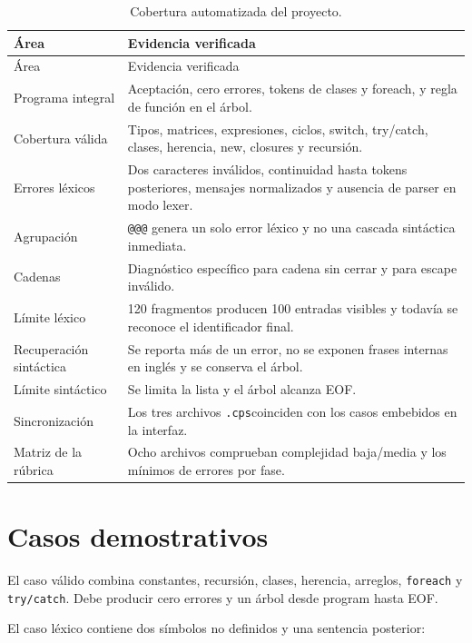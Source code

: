\documentclass[12pt,letterpaper,oneside]{report}
\renewcommand{\arraystretch}{1.2}
\newcommand{\archivo}[1]{\texttt{#1}}
\newcommand{\regla}[1]{\textsf{#1}}
\newcommand{\cps}{\texttt{.cps}}
\begin{document}
\begingroup
\small
\renewcommand{\arraystretch}{1.1}
\begin{longtable}{p{} p{}}
\caption{Cobertura automatizada del proyecto.}\label{tab:pruebas}\\
\toprule
Área & Evidencia verificada \\
\midrule
\endfirsthead
\toprule
Área & Evidencia verificada \\
\midrule
\endhead
Programa integral & Aceptación, cero errores, tokens de clases y foreach, y regla de función en el árbol. \\
Cobertura válida & Tipos, matrices, expresiones, ciclos, switch, try/catch, clases, herencia, new, closures y recursión. \\
Errores léxicos & Dos caracteres inválidos, continuidad hasta tokens posteriores, mensajes normalizados y ausencia de parser en modo lexer. \\
Agrupación & \archivo{@@@} genera un solo error léxico y no una cascada sintáctica inmediata. \\
Cadenas & Diagnóstico específico para cadena sin cerrar y para escape inválido. \\
Límite léxico & 120 fragmentos producen 100 entradas visibles y todavía se reconoce el identificador final. \\
Recuperación sintáctica & Se reporta más de un error, no se exponen frases internas en inglés y se conserva el árbol. \\
Límite sintáctico & Se limita la lista y el árbol alcanza EOF. \\
Sincronización & Los tres archivos \cps coinciden con los casos embebidos en la interfaz. \\
Matriz de la rúbrica & Ocho archivos comprueban complejidad baja/media y los mínimos de errores por fase. \\
\bottomrule
\end{longtable}
\endgroup

\section{Casos demostrativos}

El caso válido combina constantes, recursión, clases, herencia, arreglos,
\archivo{foreach} y \archivo{try/catch}. Debe producir cero errores y un árbol desde
\regla{program} hasta EOF.

El caso léxico contiene dos símbolos no definidos y una sentencia posterior:
\end{document}
